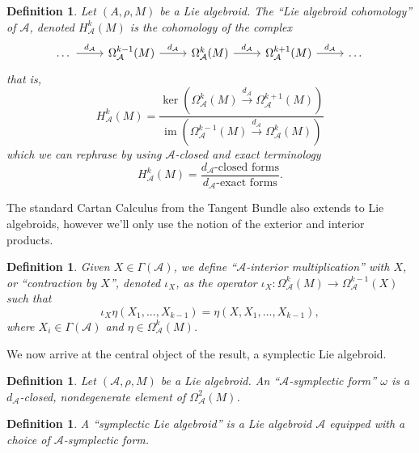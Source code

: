 \documentclass{amsart}
\newcommand{\ra}{\rightarrow}
\newtheorem{definition}[theorem]{Definition}
\newcommand{\A}{\mathcal{A}}
\theoremstyle{definition}
\DeclareMathOperator{\im}{im}
\begin{document}
\begin{definition}
    Let $(A,\rho,M)$ be a Lie algebroid. The ``Lie algebroid cohomology'' of $\A$, denoted $H^k_\A(M)$ is the cohomology of the complex
\[\begin{tikzcd}[ampersand replacement=\&]
	\dots \& {\Omega^{k-1}_\A(M)} \& {\Omega^k_\A(M)} \& {\Omega^{k+1}_\A(M)} \& \dots
	\arrow["{d_\A}", from=1-1, to=1-2]
	\arrow["{d_\A}", from=1-2, to=1-3]
	\arrow["{d_\A}", from=1-3, to=1-4]
	\arrow["{d_\A}", from=1-4, to=1-5]
\end{tikzcd}\]
that is,
\begin{equation*}
     H_\A^k(M) = \frac{\ker\left(\Omega^k_\A(M) \xrightarrow{d_\A}\Omega^{k+1}_\A(M)\right)}{\im \left( \Omega^{k-1}_\A(M) \xrightarrow{d_\A}\Omega^k_\A(M) \right)}
\end{equation*}
which we can rephrase by using $\A$-closed and exact terminology
\begin{equation*}
    H_\A^k(M) = \frac{d_\A\text{-closed forms}}{d_\A\text{-exact forms}}.
\end{equation*}
\end{definition}
The standard Cartan Calculus from the Tangent Bundle also extends to Lie algebroids, however we'll only use the notion of the exterior and interior products.
\begin{definition}
    Given $X \in \Gamma (\A)$, we define ``$\A$-interior multiplication'' with $X$, or ``contraction by $X$'', denoted $\iota_X$, as the operator $\iota_X:\Omega^k_\A(M) \ra \Omega^{k-1}_\A(X)$ such that
    \begin{equation*}
        \iota_X\eta(X_1,...,X_{k-1}) = \eta(X,X_1,...,X_{k-1}),
    \end{equation*}
    where $X_i \in \Gamma(\A)$ and $\eta \in \Omega_\A^k(M)$.
\end{definition}
We now arrive at the central object of the result, a symplectic Lie algebroid.
\begin{definition}
    Let $(\A, \rho , M)$ be a Lie algebroid. An ``$\A$-symplectic form'' $\omega$ is a $d_\A$-closed, nondegenerate element of $\Omega^2_\A(M)$.
\end{definition}
\begin{definition}
    A ``symplectic Lie algebroid'' is a Lie algebroid $\A$ equipped with a choice of $\A$-symplectic form.
\end{definition}
\end{document}
